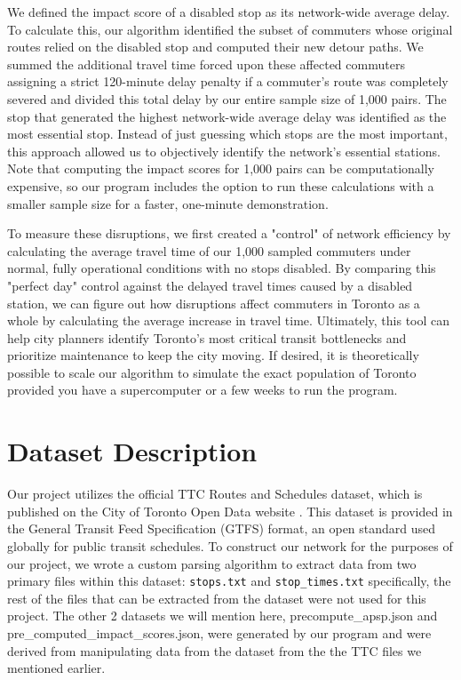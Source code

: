 \documentclass[fontsize=11pt]{article}
\begin{document}
\vspace{1em}

We defined the impact score of a disabled stop as its network-wide average delay. To calculate this, our algorithm identified the subset of commuters whose original routes relied on the disabled stop and computed their new detour paths. We summed the additional travel time forced upon these affected commuters assigning a strict 120-minute delay penalty if a commuter's route was completely severed and divided this total delay by our entire sample size of 1,000 pairs. The stop that generated the highest network-wide average delay was identified as the most essential stop. Instead of just guessing which stops are the most important, this approach allowed us to objectively identify the network's essential stations. Note that computing the impact scores for 1,000 pairs can be computationally expensive, so our program includes the option to run these calculations with a smaller sample size for a faster, one-minute demonstration.

\vspace{1em}

To measure these disruptions, we first created a "control" of network efficiency by calculating the average travel time of our 1,000 sampled commuters under normal, fully operational conditions with no stops disabled. By comparing this "perfect day" control against the delayed travel times caused by a disabled station, we can figure out how disruptions affect commuters in Toronto as a whole by calculating the average increase in travel time. Ultimately, this tool can help city planners identify Toronto's most critical transit bottlenecks and prioritize maintenance to keep the city moving. If desired, it is theoretically possible to scale our algorithm to simulate the exact population of Toronto provided you have a supercomputer or a few weeks to run the program.

\section*{Dataset Description}
Our project utilizes the official TTC Routes and Schedules dataset, which is published on the City of Toronto Open Data website \cite{ttc_data}. This dataset is provided in the General Transit Feed Specification (GTFS) format, an open standard used globally for public transit schedules. To construct our network for the purposes of our project, we wrote a custom parsing algorithm to extract data from two primary files within this dataset: \texttt{stops.txt} and \texttt{stop\_times.txt} specifically, the rest of the files that can be extracted from the dataset were not used for this project. The other 2 datasets we will mention here, precompute\_apsp.json and pre\_computed\_impact\_scores.json, were generated by our program and were derived from manipulating data from the dataset from the the TTC files we mentioned earlier.
\end{document}
